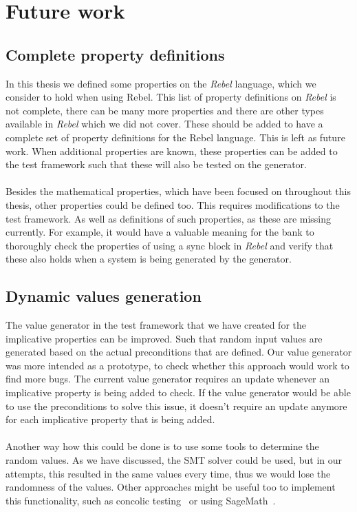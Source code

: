 \section{Future work}
\subsection*{Complete property definitions}
In this thesis we defined some properties on the \textit{Rebel} language, which we consider to hold when using Rebel. This list of property definitions on \textit{Rebel} is not complete, there can be many more properties and there are other types available in \textit{Rebel} which we did not cover. These should be added to have a complete set of property definitions for the Rebel language. This is left as future work. When additional properties are known, these properties can be added to the test framework such that these will also be tested on the generator.\\
\\
Besides the mathematical properties, which have been focused on throughout this thesis, other properties could be defined too. This requires modifications to the test framework. As well as definitions of such properties, as these are missing currently. For example, it would have a valuable meaning for the bank to thoroughly check the properties of using a sync block in \textit{Rebel} and verify that these also holds when a system is being generated by the generator.

\subsection*{Dynamic values generation}
The value generator in the test framework that we have created for the implicative properties can be improved. Such that random input values are generated based on the actual preconditions that are defined. Our value generator was more intended as a prototype, to check whether this approach would work to find more bugs. The current value generator requires an update whenever an implicative property is being added to check. If the value generator would be able to use the preconditions to solve this issue, it doesn't require an update anymore for each implicative property that is being added.\\
\\
Another way how this could be done is to use some tools to determine the random values. As we have discussed, the SMT solver could be used, but in our attempts, this resulted in the same values every time, thus we would lose the randomness of the values. Other approaches might be useful too to implement this functionality, such as concolic testing~\cite{sen2006cute} or using SageMath~\cite{siteSageMath2017}. %

